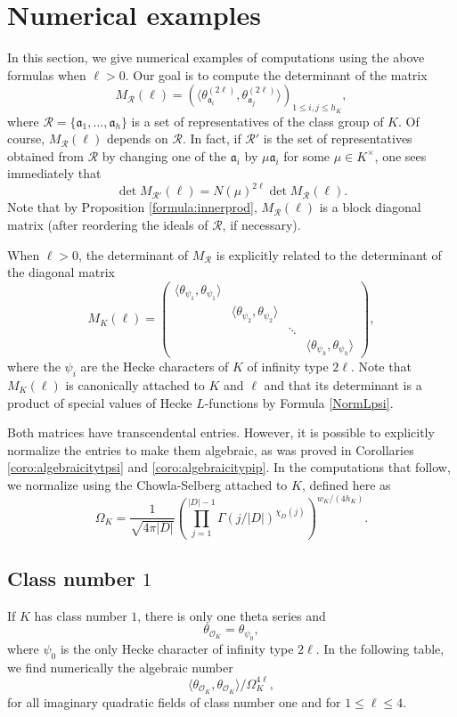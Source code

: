 \documentclass[twoside,10pt]{article}
\newcommand{\ida}{\mathfrak{a}}
\renewcommand{\O}{\mathcal{O}}
\begin{document}
\section{Numerical examples}
In this section, we give numerical examples of computations using the above formulas when $\ell>0$. Our goal is to compute the determinant of the matrix
\[M_\mathcal{R}(\ell)=(\langle\theta_{\ida_i}^{(2\ell)},\theta_{\ida_j}^{(2\ell)}\rangle)_{1\leq i,j\leq h_K},\]
where $\mathcal{R}=\{\ida_1,\dots,\ida_h\}$ is a set of representatives of the class group of $K$. Of course, $M_\mathcal{R}(\ell)$ depends on $\mathcal{R}$. In fact, if $\mathcal{R}'$ is the set of representatives obtained from $\mathcal{R}$ by changing one of the $\ida_i$ by $\mu\ida_i$ for some $\mu\in K^\times$, one sees immediately that
\[\det M_{\mathcal{R}'}(\ell)=N(\mu)^{2\ell}\det M_\mathcal{R}(\ell).\]
Note that by Proposition \ref{formula:innerprod}, $M_\mathcal{R}(\ell)$ is a block diagonal matrix (after reordering the ideals of $\mathcal{R}$, if necessary).

When $\ell>0$, the determinant of $M_\mathcal{R}$ is explicitly related to the determinant of the diagonal matrix
\[M_K(\ell)=\begin{pmatrix}
\langle\theta_{\psi_1}, \theta_{\psi_1}\rangle&  &  &  \\ 
 & \langle\theta_{\psi_2}, \theta_{\psi_2}\rangle &  &  \\ 
 &  & \ddots &  \\ 
 &  &  & \langle\theta_{\psi_h}, \theta_{\psi_h}\rangle
\end{pmatrix},
\]
where the $\psi_i$ are the Hecke characters of $K$ of infinity type $2\ell$. Note that $M_K(\ell)$ is canonically attached to $K$ and $\ell$ and that its determinant is a product of special values of Hecke $L$-functions by Formula \ref{NormLpsi}.

Both matrices have transcendental entries. However, it is possible to explicitly normalize the entries to make them algebraic, as was proved in Corollaries \ref{coro:algebraicitytpsi} and \ref{coro:algebraicitypip}. In the computations that follow, we normalize using the Chowla-Selberg attached to $K$, defined here as
\[\Omega_K = \frac{1}{\sqrt{4\pi|D|}}\left (\prod_{j=1}^{|D|-1}\Gamma(j/|D|)^{\chi_D(j)}\right )^{w_K/(4h_K)}.\]



\subsection{Class number $1$}
If $K$ has class number $1$, there is only one theta series and
\[\theta_{\O_K}=\theta_{\psi_0},\]
where $\psi_0$ is the only Hecke character of infinity type $2\ell$. In the following table, we find numerically the algebraic number
\[\langle\theta_{\O_K},\theta_{\O_K}\rangle/\Omega_K^{4\ell},\]
for all imaginary quadratic fields of class number one and for $1\leq \ell\leq 4$.
\end{document}
